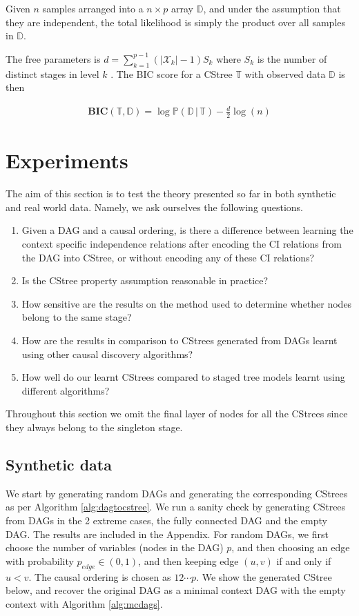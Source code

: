 \documentclass{tufte-book}
\begin{document}
Given \(n\) samples arranged into a \(n \times p\) array \(\mathbb{D}\), and under the assumption that they are independent, the total likelihood is simply the product over all samples in \(\mathbb{D}\).


The free parameters is \(d=\sum_{k=1}^{p-1} (|\mathcal{X}_k| - 1)S_k\) where \(S_k\) is the number of distinct stages in level \(k\) \cite{duarte-2021-repres-learn}. The  BIC score for a CStree \(\mathbb{T}\) with observed data \(\mathbb{D}\) is then

\begin{align*}
\textbf{BIC}(\mathbb{T},\mathbb{D}) = \log\mathbb{P}(\mathbb{D}\,|\,\mathbb{T}) - \frac{d}{2}\log(n)
\end{align*}



\chapter{Experiments}
\label{sec:org56e7111}
The aim of this section is to test the theory presented so far in both synthetic and real world data. Namely, we ask ourselves the following questions.

\begin{enumerate}
\item Given a DAG and a causal ordering, is there a difference between learning the context specific independence relations after encoding the CI relations from the DAG into CStree, or without encoding any of these CI relations?
\item Is the CStree property assumption reasonable in practice?
\item How sensitive are the results on the method used to determine whether nodes belong to the same stage?
\item How are the results in comparison to CStrees generated from DAGs learnt using other causal discovery algorithms?
\item How well do our learnt CStrees compared to staged tree models learnt using different algorithms?
\end{enumerate}


Throughout this section we omit the final layer of nodes for all the CStrees since they always belong to the singleton stage.



\section{Synthetic data}
\label{sec:org4d60b73}
We start by generating random DAGs and generating the corresponding CStrees as per Algorithm \ref{alg:dagtocstree}. We run a sanity check by generating CStrees from DAGs in the 2 extreme cases,  the fully connected DAG and the empty DAG. The results are included in the Appendix. For random DAGs, we first choose the number of variables (nodes in the DAG) \(p\), and then choosing an edge with probability \(p_{edge} \in (0,1)\), and then keeping edge \((u,v)\) if and only if \(u<v\). The causal ordering is chosen as \(12\cdots p\). We show the generated CStree below, and recover the original DAG as a minimal context DAG with the empty context with Algorithm \ref{alg:mcdags}. 
\end{document}
